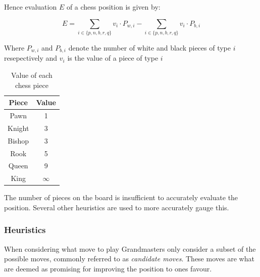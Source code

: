 Hence evaluation \( E \) of a chess position is given by:

\[
E = \sum_{i \in \{ p, n, b, r, q \}} v_i \cdot P_{w,i} - \sum_{i \in \{ p, n, b, r, q \}} v_i \cdot P_{b,i}
\]

Where \(P_{w,i}\) and  \(P_{b,i}\) denote the number of white and black pieces of type \(i\) resepectively and \(v_i\) is the value of a piece of type \(i\)

\begin{table}[H]
    \centering
    \begin{tabular}{ ||c c|| } 
      \hline
      Piece & Value\\ 
      \hline\hline
      Pawn & 1 \\ 
      \hline
      Knight & 3 \\
      \hline
      Bishop & 3 \\
      \hline
      Rook & 5 \\
      \hline
      Queen & 9 \\
      \hline
      King & $\infty$ \\
      \hline
    \end{tabular}
    \caption{Value of each chess piece}
    \label{tab:valTable}
\end{table}


The number of pieces on the board is insufficient to accurately evaluate the position. Several other heuristics are used to more accurately gauge this.

\subsubsection{Heuristics}
\label{subsubsec: Heuristics}
When considering what move to play Grandmasters only consider a subset of the possible moves, commonly referred to as \textit{candidate moves}. These moves are what are deemed as promising for improving the position to ones favour.

